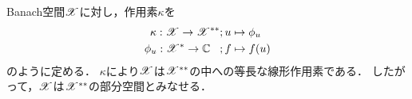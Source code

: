    \begin{Them}[定理8.23, p.189] \label{them8:23}
        Banach空間$\mathscr{X}$に対し，作用素$\kappa$を
        \begin{align*}
            \kappa: \spX \to \spX^{\ast \ast}     &;u \mapsto \phi_{u} \\
            \phi_u: \mathscr{X^{\ast}} \to \C \hspace{3truemm}&;f \mapsto f(u)
        \end{align*}
        のように定める．
        $\kappa$により$\mathscr{X}$は$\mathscr{X}^{\ast \ast}$の中への等長な線形作用素である．
        したがって，$\mathscr{X}$は$\mathscr{X}^{\ast \ast}$の部分空間とみなせる．
    \end{Them}


